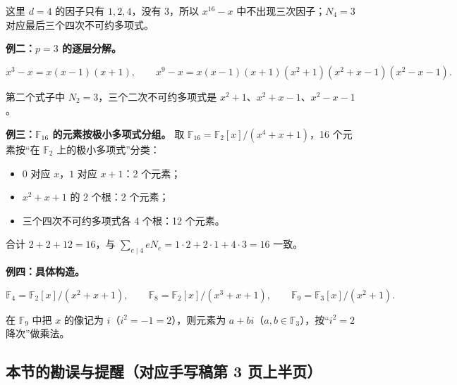 这里 $d=4$ 的因子只有 $1,2,4$，没有 $3$，所以 $x^{16}-x$ 中不出现三次因子；$N_4=3$ 对应最后三个四次不可约多项式。

\textbf{例二：$p=3$ 的逐层分解。}

\[
x^3-x=x(x-1)(x+1),\qquad
x^9-x=x(x-1)(x+1)(x^2+1)(x^2+x-1)(x^2-x-1).
\]

第二个式子中 $N_2=3$，三个二次不可约多项式是 $x^2+1$、$x^2+x-1$、$x^2-x-1$。

\textbf{例三：$\mathbb F_{16}$ 的元素按极小多项式分组。} 取 $\mathbb F_{16}=\mathbb F_2[x]/(x^4+x+1)$，16 个元素按“在 $\mathbb F_2$ 上的极小多项式”分类：

\begin{itemize}
\item $0$ 对应 $x$，$1$ 对应 $x+1$：2 个元素；
\item $x^2+x+1$ 的 2 个根：2 个元素；
\item 三个四次不可约多项式各 4 个根：12 个元素。
\end{itemize}


合计 $2+2+12=16$，与 $\sum_{e\mid4}eN_e=1\cdot2+2\cdot1+4\cdot3=16$ 一致。

\textbf{例四：具体构造。}

\[
\mathbb F_4=\mathbb F_2[x]/(x^2+x+1),\qquad
\mathbb F_8=\mathbb F_2[x]/(x^3+x+1),\qquad
\mathbb F_9=\mathbb F_3[x]/(x^2+1).
\]

在 $\mathbb F_9$ 中把 $x$ 的像记为 $i$（$i^2=-1=2$），则元素为 $a+bi$（$a,b\in\mathbb F_3$），按“$i^2=2$ 降次”做乘法。

\subsection{本节的勘误与提醒（对应手写稿第 3 页上半页）}


